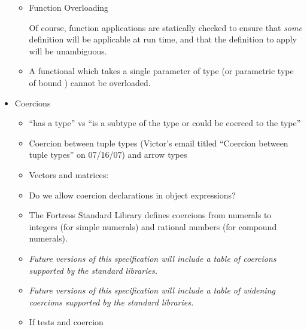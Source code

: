 \begin{itemize}
\begin{itemize}
\begin{itemize}
\end{itemize}

\item %
 Function Overloading

Of course, function applications are
statically checked to ensure that \emph{some} definition will be
applicable at run time, and that the definition to apply will
be unambiguous.

  \item A functional which takes a single parameter of type 
 (or parametric type of bound ) cannot be overloaded.
\end{itemize}

\item Coercions
\begin{itemize}
 \item ``has a type'' vs ``is a subtype of the type or could be coerced to the type''
\item Coercion between tuple types (Victor's email titled ``Coercion between tuple types'' on 07/16/07) and arrow types

\item Vectors and matrices: 

\item Do we allow coercion declarations in object expressions?

\item {}

The Fortress Standard Library defines coercions
from numerals to integers (for simple numerals)
and rational numbers (for compound numerals).

\item \emph{Future versions of this specification will include a table of
  coercions supported by the standard libraries.}

\item \emph{Future versions of this specification will include a table of
  widening coercions supported by the standard libraries.}

\item If tests and coercion


\end{itemize}
\end{itemize}
